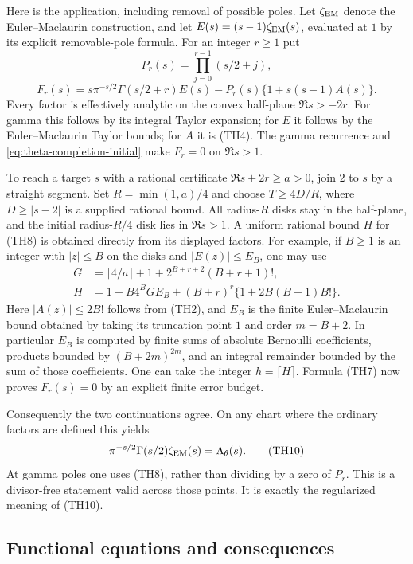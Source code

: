 Here is the application, including removal of possible poles.
Let $\zeta_{\rm EM}$ denote the Euler--Maclaurin construction, and
let $E(s)=(s-1)\zeta_{\rm EM}(s)$, evaluated at $1$ by its explicit
removable-pole formula.  For an integer $r\ge1$ put
\[
 P_r(s)=\prod_{j=0}^{r-1}(s/2+j),
\]
\[
 F_r(s)=s\pi^{-s/2}\Gamma(s/2+r)E(s)
            -P_r(s)\{1+s(s-1)A(s)\}.              \tag{TH8}
\]
Every factor is effectively analytic on the convex half-plane
$\Re s>-2r$.  For gamma this follows by its integral Taylor expansion;
for $E$ it follows by the Euler--Maclaurin Taylor bounds; for $A$ it
is (TH4).  The gamma recurrence and
\eqref{eq:theta-completion-initial} make $F_r=0$ on $\Re s>1$.

To reach a target $s$ with a rational certificate
$\Re s+2r\ge a>0$, join $2$ to $s$ by a straight segment.  Set
$R=\min(1,a)/4$ and choose
$T\ge4D/R$, where $D\ge|s-2|$ is a supplied rational bound.
All radius-$R$ disks stay in the half-plane, and the initial
radius-$R/4$ disk lies in $\Re s>1$.  A uniform rational bound $H$
for (TH8) is obtained directly from its displayed factors.  For
example, if $B\ge1$ is an integer with $|z|\le B$ on the disks and $|E(z)|\le E_B$, one may use
\[
 \begin{split}
 G&=\lceil4/a\rceil+1+2^{B+r+2}(B+r+1)!,\\
 H&=1+B4^BGE_B+(B+r)^r\{1+2B(B+1)B!\}.
 \end{split}                                                   \tag{TH9}
\]
Here $|A(z)|\le2B!$ follows from (TH2), and $E_B$ is the finite
Euler--Maclaurin bound obtained by taking its truncation point $1$
and order $m=B+2$.  In particular $E_B$ is computed by finite sums
of absolute Bernoulli coefficients, products bounded by
$(B+2m)^{2m}$, and an integral remainder bounded by the sum of those
coefficients.  One can take the integer $h=\lceil H\rceil$.
Formula (TH7) now proves $F_r(s)=0$ by an explicit finite error budget.

Consequently the two continuations agree.  On any chart where the
ordinary factors are defined this yields
\[
 \pi^{-s/2}\Gamma(s/2)\zeta_{\rm EM}(s)=\Lambda_\theta(s).
                                                               \tag{TH10}
\]
At gamma poles one uses (TH8), rather than dividing by a zero of
$P_r$.  This is a divisor-free statement valid across those points.
It is exactly the regularized meaning of (TH10).

\subsection{Functional equations and consequences}

